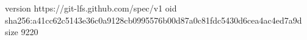 version https://git-lfs.github.com/spec/v1
oid sha256:a41cc62c5143e36c0a9128cb0995576b00d87a0c81fdc5430d6cea4ac4ed7a9d
size 9220
